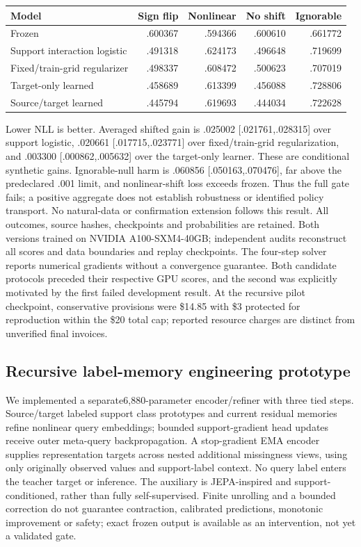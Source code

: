 \documentclass[10pt]{article}
\begin{document}
\begin{center}
\begin{tabular}{lrrrr}
\toprule
Model & Sign flip & Nonlinear & No shift & Ignorable\\
\midrule
Frozen & .600367 & .594366 & .600610 & .661772\\
Support interaction logistic & .491318 & .624173 & .496648 & .719699\\
Fixed/train-grid regularizer & .498337 & .608472 & .500623 & .707019\\
Target-only learned & .458689 & .613399 & .456088 & .728806\\
Source/target learned & .445794 & .619693 & .444034 & .722628\\
\bottomrule
\end{tabular}
\end{center}
Lower NLL is better. Averaged shifted gain is .025002 [.021761,.028315] over support logistic, .020661 [.017715,.023771] over fixed/train-grid regularization, and .003300 [.000862,.005632] over the target-only learner. These are conditional synthetic gains. Ignorable-null harm is .060856 [.050163,.070476], far above the predeclared .001 limit, and nonlinear-shift loss exceeds frozen. Thus the full gate fails; a positive aggregate does not establish robustness or identified policy transport. No natural-data or confirmation extension follows this result. All outcomes, source hashes, checkpoints and probabilities are retained. Both versions trained on NVIDIA A100-SXM4-40GB; independent audits reconstruct all scores and data boundaries and replay checkpoints. The four-step solver reports numerical gradients without a convergence guarantee. Both candidate protocols preceded their respective GPU scores, and the second was explicitly motivated by the first failed development result. At the recursive pilot checkpoint, conservative provisions were \$14.85 with \$3 protected for reproduction within the \$20 total cap; reported resource charges are distinct from unverified final invoices.


\subsection{Recursive label-memory engineering prototype}
We implemented a separate6,880-parameter encoder/refiner with three tied steps. Source/target labeled support class prototypes and current residual memories refine nonlinear query embeddings; bounded support-gradient head updates receive outer meta-query backpropagation. A stop-gradient EMA encoder supplies representation targets across nested additional missingness views, using only originally observed values and support-label context. No query label enters the teacher target or inference. The auxiliary is JEPA-inspired and support-conditioned, rather than fully self-supervised\cite{ijepa,vicreg,maml}. Finite unrolling and a bounded correction do not guarantee contraction, calibrated predictions, monotonic improvement or safety; exact frozen output is available as an intervention, not yet a validated gate.
\end{document}
